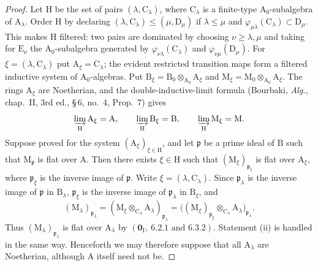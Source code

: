 \begin{proof}
Let $\mathrm{H}$ be the set of pairs $(\lambda,\mathrm{C}_\lambda)$,
where $\mathrm{C}_\lambda$ is a finite-type
$\mathrm{A}_0$-subalgebra of $\mathrm{A}_\lambda$. Order $\mathrm{H}$ by
declaring $(\lambda,\mathrm{C}_\lambda)\leqslant
(\mu,\mathrm{D}_\mu)$ if $\lambda\leqslant\mu$ and
$\varphi_{\mu\lambda}(\mathrm{C}_\lambda)\subset\mathrm{D}_\mu$.
This makes $\mathrm{H}$ filtered: two pairs are dominated by choosing
$\nu\geqslant\lambda,\mu$ and taking for $\mathrm{E}_\nu$ the
$\mathrm{A}_0$-subalgebra generated by
$\varphi_{\nu\lambda}(\mathrm{C}_\lambda)$ and
$\varphi_{\nu\mu}(\mathrm{D}_\mu)$. For
$\xi=(\lambda,\mathrm{C}_\lambda)$ put
$\mathrm{A}_\xi=\mathrm{C}_\lambda$; the evident restricted transition
maps form a filtered inductive system of $\mathrm{A}_0$-algebras.
Put
$\mathrm{B}_\xi=\mathrm{B}_0\otimes_{\mathrm{A}_0}\mathrm{A}_\xi$
and
$\mathrm{M}_\xi=\mathrm{M}_0\otimes_{\mathrm{A}_0}\mathrm{A}_\xi$.
The rings $\mathrm{A}_\xi$ are Noetherian, and the double-inductive-limit
formula (Bourbaki, \emph{Alg.}, chap.~II, 3rd ed., \S\,6, no.~4,
Prop.~7) gives
\[
  \varinjlim_{\mathrm H}\mathrm{A}_\xi=\mathrm{A},\qquad
  \varinjlim_{\mathrm H}\mathrm{B}_\xi=\mathrm{B},\qquad
  \varinjlim_{\mathrm H}\mathrm{M}_\xi=\mathrm{M}.
\]
Suppose  proved for the system
$(\mathrm{A}_\xi)_{\xi\in\mathrm H}$, and let $\mathfrak p$ be a prime
ideal of $\mathrm B$ such that $\mathrm M_{\mathfrak p}$ is flat over
$\mathrm A$. Then there exists $\xi\in\mathrm H$ such that
$(\mathrm{M}_\xi)_{\mathfrak{p}_\xi}$ is flat over
$\mathrm{A}_\xi$, where $\mathfrak p_\xi$ is the inverse image of
$\mathfrak p$. Write $\xi=(\lambda,\mathrm{C}_\lambda)$. Since
$\mathfrak{p}_\lambda$ is the inverse image of $\mathfrak p$ in
$\mathrm{B}_\lambda$, $\mathfrak p_\xi$ is the inverse image of
$\mathfrak p_\lambda$ in $\mathrm B_\xi$, and
\[
  (\mathrm{M}_\lambda)_{\mathfrak p_\lambda}
  =(\mathrm{M}_\xi\otimes_{\mathrm{C}_\lambda}
    \mathrm{A}_\lambda)_{\mathfrak p_\lambda}
  =\bigl((\mathrm{M}_\xi)_{\mathfrak p_\xi}
    \otimes_{\mathrm{C}_\lambda}\mathrm{A}_\lambda
    \bigr)_{\mathfrak p_\lambda}.
\]
Thus $(\mathrm{M}_\lambda)_{\mathfrak p_\lambda}$ is flat over
$\mathrm{A}_\lambda$ by
$(\mathbf{0}_\mathrm{I},~6.2.1\text{ and }6.3.2)$. Statement (ii) is
handled in the same way. Henceforth we may therefore suppose that all
$\mathrm{A}_\lambda$ are Noetherian, although $\mathrm A$ itself need
not be.


\end{proof}
